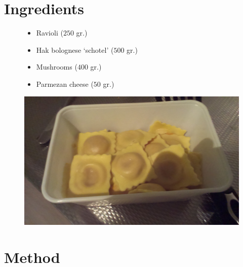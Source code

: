 \documentclass[a4paper,12pt]{report}
\begin{document}
\section*{Ingredients}
\begin{figure}[h]

\begin{minipage}{0.65\textwidth}
\begin{itemize}
\item Ravioli ($250$ gr.)
\item Hak bolognese `schotel' ($500$ gr.)
\item Mushrooms ($400$ gr.)
\item Parmezan cheese ($50$ gr.)
\end{itemize}
\end{minipage}
\begin{minipage}{0.3\textwidth}
	\includegraphics[scale=0.07]{Images/ravioli.jpg}
\end{minipage}
\end{figure}


\section*{Method}
\end{document}
